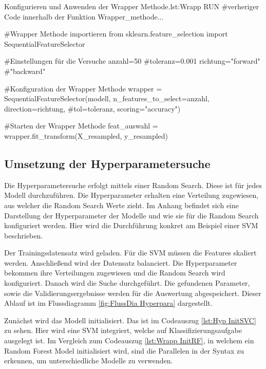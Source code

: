 \begin{pythoncode}{Konfigurieren und Anwenden der Wrapper Methode.}{lst:Wrapp RUN}
#verheriger Code innerhalb der Funktion Wrapper_methode...

#Wrapper Methode importieren
from sklearn.feature_selection import SequentialFeatureSelector

#Einstellungen für die Versuche
anzahl=50
#toleranz=0.001
richtung="forward" #"backward"

#Konfiguration der Wrapper Methode
wrapper = SequentialFeatureSelector(modell, 
                n_features_to_select=anzahl, 
                direction=richtung, 
                #tol=toleranz, 
                scoring="accuracy")

#Starten der Wrapper Methode
feat_auswahl = wrapper.fit_transform(X_resampled, y_resampled)
\end{pythoncode}



\subsection{Umsetzung der Hyperparametersuche}
Die Hyperparametersuche erfolgt mittels einer Random Search. Diese ist für jedes Modell durchzuführen. Die Hyperparameter erhalten eine Verteilung zugewiesen, aus welcher die Random Search Werte zieht. Im Anhang befindet sich eine Darstellung der Hyperparameter der Modelle und wie sie für die Random Search konfiguriert werden. Hier wird die Durchführung konkret am Beispiel einer SVM beschrieben.  \par

Der Trainingsdatensatz wird geladen. Für die SVM müssen die Features skaliert werden. Anschließend wird der Datensatz balanciert. Die Hyperparameter bekommen ihre Verteilungen zugewiesen und die Random Search wird konfiguriert. Danach wird die Suche durchgeführt. Die gefundenen Parameter, sowie die Validierungsergebnisse werden für die Auswertung abgespeichert. Dieser Ablauf ist im Flussdiagramm \ref{fig:FlussDia Hyperpara} dargestellt.


Zunächst wird das Modell initialisiert. Das ist im Codeauszug \ref{lst:Hyp InitSVC} zu sehen. Hier wird eine SVM integriert, welche auf Klassifizierungsaufgabe ausgelegt ist. Im Vergleich zum Codeauszug \ref{lst:Wrapp InitRF}, in welchem ein Random Forest Model initialisiert wird, sind die Parallelen in der Syntax zu erkennen, um unterschiedliche Modelle zu verwenden. 

